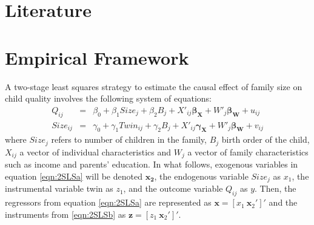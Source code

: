 \documentclass{article}[11pt,subeqn]
\newcommand{\vect}[1]{\mathbf{#1}}
\begin{document}
\begin{spacing}{1.25}
\vspace{-5mm}
\section{Literature}
\label{scn:lit}
\vspace{-5mm}




\section{Empirical Framework}
A two-stage least squares strategy to estimate the causal effect of family size on child quality involves the following system of equations:
\begin{subequations}
\label{eqn:2SLS}
\begin{eqnarray}
\label{eqn:QQ}
Q_{ij}&=&\beta_0+\beta_1Size_j+\beta_2B_{j}+X'_{ij}\vect{\beta_{\vect{X}}}+W'_j\vect{\beta_\vect{W}}+u_{ij} \label{eqn:2SLSa}\\
Size_{ij}&=&\gamma_0+\gamma_1Twin_{ij}+\gamma_2B_{j}+X'_{ij}\vect{\gamma_\vect{X}}+W'_j\vect{\beta_\vect{W}}+v_{ij} \label{eqn:2SLSb}
 \end{eqnarray}
\end{subequations}
where $Size_j$ refers to number of children in the family, $B_j$ birth order of the child, $X_{ij}$ a vector
of individual characteristics and $W_j$ a vector of family characteristics such as income and parents' education.
In what follows, exogenous variables in equation \ref{eqn:2SLSa} will be denoted $\mathbf{x_2}$, the
endogenous variable $Size_j$ as $x_1$, the instrumental variable twin as $z_1$, and the outcome variable
$Q_{ij}$ as $y$.  Then, the regressors from equation \ref{eqn:2SLSa} are represented as
$\vect{x}=[x_1\ \vect{x}_2']'$ and the instruments from \ref{eqn:2SLSb} as $\vect{z}=[z_1\ \vect{x}_2']'$.


\end{spacing}
\end{document}
